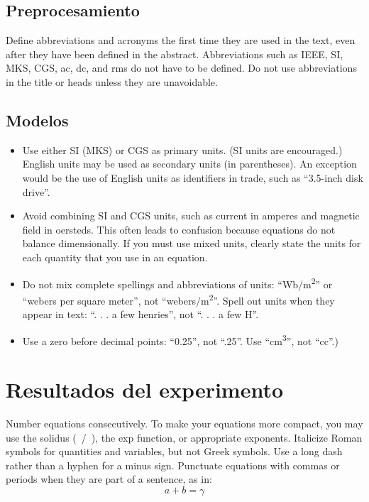 \documentclass[conference]{IEEEtran}
\begin{document}
\subsection{Preprocesamiento}
Define abbreviations and acronyms the first time they are used in the text, 
even after they have been defined in the abstract. Abbreviations such as 
IEEE, SI, MKS, CGS, ac, dc, and rms do not have to be defined. Do not use 
abbreviations in the title or heads unless they are unavoidable.

\subsection{Modelos}
\begin{itemize}
\item Use either SI (MKS) or CGS as primary units. (SI units are encouraged.) English units may be used as secondary units (in parentheses). An exception would be the use of English units as identifiers in trade, such as ``3.5-inch disk drive''.
\item Avoid combining SI and CGS units, such as current in amperes and magnetic field in oersteds. This often leads to confusion because equations do not balance dimensionally. If you must use mixed units, clearly state the units for each quantity that you use in an equation.
\item Do not mix complete spellings and abbreviations of units: ``Wb/m\textsuperscript{2}'' or ``webers per square meter'', not ``webers/m\textsuperscript{2}''. Spell out units when they appear in text: ``. . . a few henries'', not ``. . . a few H''.
\item Use a zero before decimal points: ``0.25'', not ``.25''. Use ``cm\textsuperscript{3}'', not ``cc''.)
\end{itemize}

\section{Resultados del experimento}
Number equations consecutively. To make your 
equations more compact, you may use the solidus (~/~), the exp function, or 
appropriate exponents. Italicize Roman symbols for quantities and variables, 
but not Greek symbols. Use a long dash rather than a hyphen for a minus 
sign. Punctuate equations with commas or periods when they are part of a 
sentence, as in:
\begin{equation}
a+b=\gamma\label{eq}
\end{equation}
\end{document}
